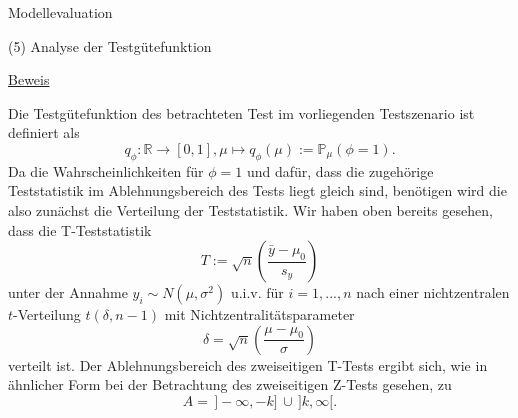 \documentclass[
  8pt,
  ignorenonframetext,
]{beamer}
\begin{document}
\begin{frame}{Modellevaluation}
\protect\hypertarget{modellevaluation-9}{}

\noindent (5) Analyse der Testgütefunktion

\footnotesize

\underline{Beweis}

Die Testgütefunktion des betrachteten Test im vorliegenden Testszenario
ist definiert als \begin{equation}
q_{\phi} : \mathbb{R} \to [0,1],
\mu \mapsto q_{\phi}(\mu) := \mathbb{P}_{\mu}(\phi = 1).
\end{equation} Da die Wahrscheinlichkeiten für \(\phi = 1\) und dafür,
dass die zugehörige Teststatistik im Ablehnungsbereich des Tests liegt
gleich sind, benötigen wird die also zunächst die Verteilung der
Teststatistik. Wir haben oben bereits gesehen, dass die T-Teststatistik
\begin{equation}
T := \sqrt{n}\left(\frac{\bar{y} - \mu_0}{s_y} \right)
\end{equation} unter der Annahme
\(y_i \sim N(\mu,\sigma^2) \mbox{ u.i.v. für } i = 1,...,n\) nach einer
nichtzentralen \(t\)-Verteilung \(t(\delta,n-1)\) mit
Nichtzentralitätsparameter \begin{equation}
\delta = \sqrt{n}\left(\frac{\mu - \mu_0}{\sigma}\right)
\end{equation} verteilt ist. Der Ablehnungsbereich des zweiseitigen
T-Tests ergibt sich, wie in ähnlicher Form bei der Betrachtung des
zweiseitigen Z-Tests gesehen, zu \begin{equation}
A  = \,]-\infty, -k]\, \cup \,]k,\infty[.
\end{equation} \vfill
\end{frame}
\end{document}
